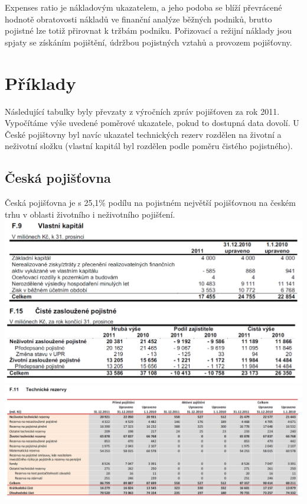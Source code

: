\documentclass[12pt,oneside]{fithesis}
\begin{document}
Expenses ratio je nákladovým ukazatelem, a jeho podoba se blíží převrácené hodnotě obratovosti nákladů ve finanční analýze běžných podniků, brutto pojistné lze totiž přirovnat k tržbám podniku. Pořizovací a režijní náklady jsou spjaty se získáním pojištění, údržbou pojistných vztahů a provozem pojišťovny.

\chapter{Příklady}
Následující tabulky byly převzaty z výročních zpráv pojišťoven za rok 2011. Vypočítáme výše uvedené poměrové ukazatele, pokud to dostupná data dovolí. U České pojištovny byl navíc ukazatel technických rezerv rozdělen na životní a neživotní složku (vlastní kapitál byl rozdělen podle poměru čistého pojistného).
\section{Česká pojišťovna}
Česká pojišťovna je s 25,1\% podílu na pojistném největší pojišťovnou na českém trhu v oblasti životního i neživotního pojišťení.\\
\includegraphics[width=1.0\textwidth]{cp-vlk.png}
\includegraphics[width=1.0\textwidth]{cp-poj.png}
\includegraphics[width=1.0\textwidth]{cp-tr.png}
\end{document}
